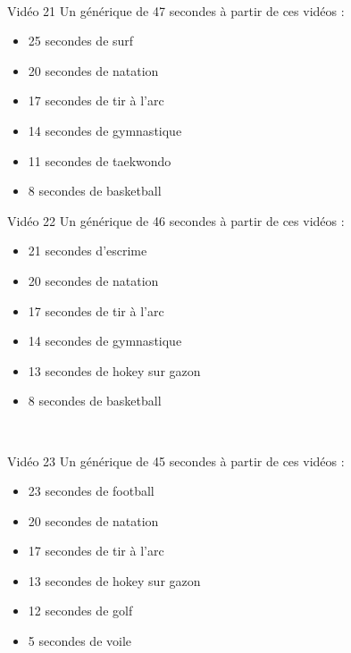 \documentclass[10pt, a5paper,twoside]{article}
\begin{document}
\vfill

\clearpage
~
\vfill

\begin{card}[width = \textwidth, colback = olympicyellow, colframe = olympicyellow, bottomtitle = 2mm]{Vidéo 21}
  Un générique de 47 secondes à partir de ces vidéos :
  \vspace{-1mm}\begin{itemize}
    \item 25 secondes de surf
    \item 20 secondes de natation
    \item 17 secondes de tir à l'arc
    \item 14 secondes de gymnastique
    \item 11 secondes de taekwondo
    \item 8 secondes de basketball
  \end{itemize}
\end{card}

\vfill

\begin{card}[width = \textwidth, colback = olympicyellow, colframe = olympicyellow, bottomtitle = 2mm]{Vidéo 22}
  Un générique de 46 secondes à partir de ces vidéos :
  \vspace{-1mm}\begin{itemize}
    \item 21 secondes d'escrime
    \item 20 secondes de natation
    \item 17 secondes de tir à l'arc
    \item 14 secondes de gymnastique
    \item 13 secondes de hokey sur gazon
    \item 8 secondes de basketball
  \end{itemize}
\end{card}

\vfill

\clearpage
~
\vfill

\begin{card}[width = \textwidth, colback = olympicyellow, colframe = olympicyellow, bottomtitle = 2mm]{Vidéo 23}
  Un générique de 45 secondes à partir de ces vidéos :
  \vspace{-1mm}\begin{itemize}
    \item 23 secondes de football
    \item 20 secondes de natation
    \item 17 secondes de tir à l'arc
    \item 13 secondes de hokey sur gazon
    \item 12 secondes de golf
    \item 5 secondes de voile
  \end{itemize}
\end{card}
\end{document}
